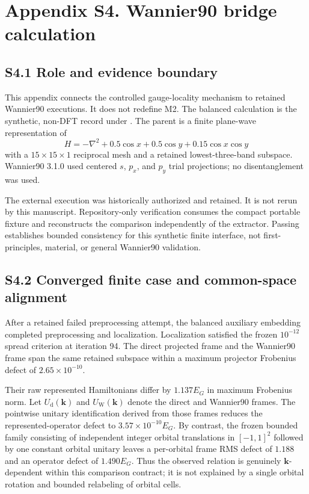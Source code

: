 \section*{Appendix S4. Wannier90 bridge calculation}
\label{supp:wannier90-bridge}
\renewcommand{\theequation}{S4.\arabic{equation}}
\setcounter{equation}{0}
\renewcommand{\thetable}{S4.\arabic{table}}
\setcounter{table}{0}
\renewcommand{\thefigure}{S4.\arabic{figure}}
\setcounter{figure}{0}

\subsection*{S4.1 Role and evidence boundary}

This appendix connects the controlled gauge-locality mechanism to retained
Wannier90 executions. It does not redefine M2. The balanced calculation is the
synthetic, non-DFT record
 under
. The parent is a finite
plane-wave representation of
\begin{equation}
 H=-\nabla^2+0.5\cos x+0.5\cos y+0.15\cos x\cos y
 \label{eq:supp-s4-parent}
\end{equation}
with a $15\times15\times1$ reciprocal mesh and a retained lowest-three-band
subspace. Wannier90 3.1.0 used centered $s$, $p_x$, and $p_y$ trial
projections; no disentanglement was used.

The external execution was historically authorized and retained. It is not
rerun by this manuscript. Repository-only verification consumes the compact
portable fixture and reconstructs the comparison independently of the
extractor. Passing establishes bounded consistency for this synthetic finite
interface, not first-principles, material, or general Wannier90 validation.

\subsection*{S4.2 Converged finite case and common-space alignment}

After a retained failed preprocessing attempt, the balanced auxiliary embedding
completed preprocessing and localization. Localization satisfied the frozen
$10^{-12}$ spread criterion at iteration 94. The direct projected frame and the
Wannier90 frame span the same retained subspace within a maximum projector
Frobenius defect of $2.65\times10^{-10}$.

Their raw represented Hamiltonians differ by $1.137E_G$ in maximum Frobenius
norm. Let $U_{\mathrm d}(\bm k)$ and $U_{\mathrm W}(\bm k)$ denote the direct
and Wannier90 frames. The pointwise unitary identification derived from those
frames reduces the represented-operator defect to
$3.57\times10^{-10}E_G$. By contrast, the frozen bounded family consisting of
independent integer orbital translations in $[-1,1]^2$ followed by one constant
orbital unitary leaves a per-orbital frame RMS defect of $1.188$ and an operator
defect of $1.490E_G$. Thus the observed relation is genuinely
$\bm k$-dependent within this comparison contract; it is not explained by a
single orbital rotation and bounded relabeling of orbital cells.

